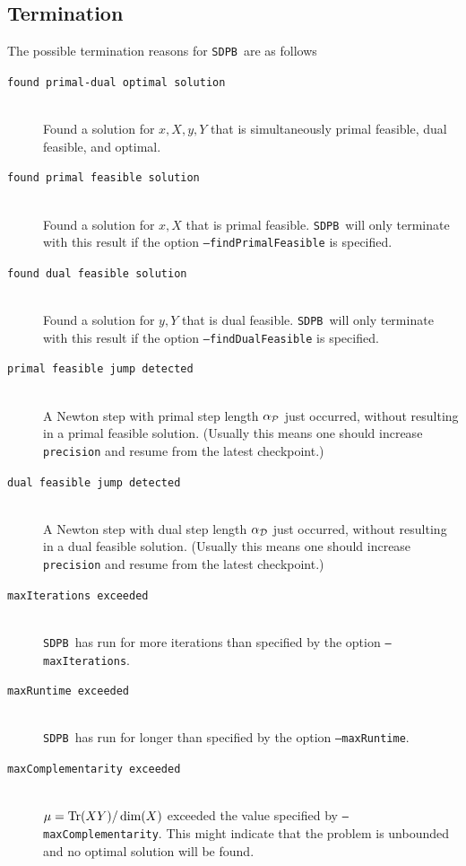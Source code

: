 \documentclass[12pt]{article}
\numberwithin{equation}{section}
\newcommand\SDPB{\texttt{SDPB}}
\begin{document}
\subsection{Termination}

The possible termination reasons for \SDPB\ are as follows
\begin{description}
\item[\texttt{found primal-dual optimal solution}] \hfill\\
Found a solution for $x,X,y,Y$ that is simultaneously primal feasible, dual feasible, and optimal.
\item[\texttt{found primal feasible solution}] \hfill\\
Found a solution for $x,X$ that is primal feasible.  \SDPB\ will only terminate with this result if the option \texttt{--findPrimalFeasible} is specified.
\item[\texttt{found dual feasible solution}] \hfill\\
Found a solution for $y,Y$ that is dual feasible.  \SDPB\ will only terminate with this result if the option \texttt{--findDualFeasible} is specified.
\item[\texttt{primal feasible jump detected}] \hfill\\
A Newton step with primal step length $\alpha_{\mathcal{P}}$ just occurred, without resulting in a primal feasible solution.  (Usually this means one should increase \texttt{precision} and resume from the latest checkpoint.)
\item[\texttt{dual feasible jump detected}] \hfill\\
A Newton step with dual step length $\alpha_{\mathcal{D}}$ just occurred, without resulting in a dual feasible solution.  (Usually this means one should increase \texttt{precision} and resume from the latest checkpoint.)
\item[\texttt{maxIterations exceeded}] \hfill\\
\SDPB\ has run for more iterations than specified by the option \texttt{--maxIterations}.
\item[\texttt{maxRuntime exceeded}] \hfill\\
\SDPB\ has run for longer than specified by the option \texttt{--maxRuntime}.
\item[\texttt{maxComplementarity exceeded}] \hfill\\
$\mu=\mathrm{Tr}(XY)/\dim(X)$ exceeded the value specified by \texttt{--maxComplementarity}.  This might indicate that the problem is unbounded and no optimal solution will be found.
\end{description}
\end{document}
